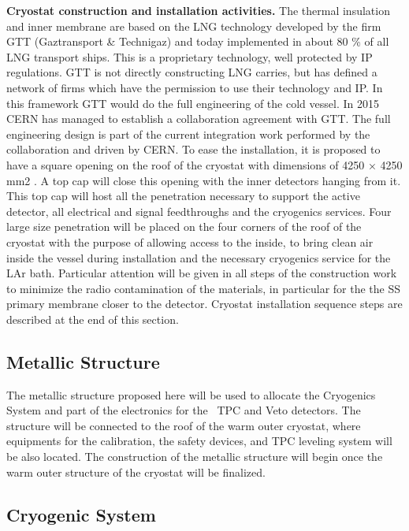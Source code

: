 {\bf Cryostat construction and installation activities.}
The thermal insulation and inner membrane are based on the LNG technology developed by the firm GTT (Gaztransport \& Technigaz) and today implemented in about 80 \% of all LNG transport ships. This is a proprietary technology, well protected by IP regulations. GTT is not directly constructing LNG carries, but has defined a network of firms which have the permission to use their technology and IP. In this framework GTT would do the full engineering of the cold vessel. In 2015 CERN has managed to establish a collaboration agreement with GTT. The full engineering design is part of the current integration work performed by the collaboration and driven by CERN. 
To ease the installation, it is proposed to have a square opening on the roof of the cryostat with dimensions of 4250 × 4250 mm2 . A top cap will close this opening with the inner detectors hanging from it. This top cap will host all the penetration necessary to support the active detector, all electrical and signal feedthroughs and the cryogenics services.
Four large size penetration will be placed on the four corners of the roof of the cryostat with the purpose of allowing access to the inside, to bring clean air inside the vessel during installation and the necessary cryogenics service for the LAr bath.
Particular attention will be given in all steps of the construction work to minimize the radio contamination of the materials, in particular for the the SS primary membrane closer to the detector. Cryostat installation sequence steps are described at the end of this section.

\subsection{Metallic Structure}
\label{sec:MetallicStructure}

The metallic structure proposed here will be used to allocate the Cryogenics System and part of the electronics for the \DSks\ TPC and Veto detectors. The structure will be
connected to the roof of the warm outer cryostat, where equipments for the calibration, the safety devices, and TPC leveling system will be also located. The construction of the metallic structure will begin once the warm outer structure of the cryostat will be finalized.

\subsection{Cryogenic System}
\label{sec:CryogenicSystem}

